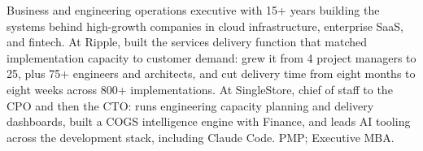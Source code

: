 \documentclass[11pt,letterpaper,sans]{moderncv}
\begin{document}
\makecvtitle


\vspace{6pt}
\small{Business and engineering operations executive with 15+ years building the systems behind high-growth companies in cloud infrastructure, enterprise SaaS, and fintech. At Ripple, built the services delivery function that matched implementation capacity to customer demand: grew it from 4 project managers to 25, plus 75+ engineers and architects, and cut delivery time from eight months to eight weeks across 800+ implementations. At SingleStore, chief of staff to the CPO and then the CTO: runs engineering capacity planning and delivery dashboards, built a COGS intelligence engine with Finance, and leads AI tooling across the development stack, including Claude Code. PMP; Executive MBA.}

\end{document}
